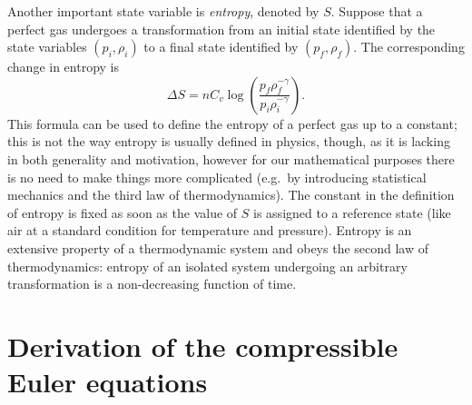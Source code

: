 Another important state variable is \emph{entropy}, denoted by $S$.
Suppose that a perfect gas undergoes a transformation from an initial
state identified by the state variables $(p_i,\rho_i)$ to a final state
identified by $(p_f,\rho_f)$. The corresponding change in entropy is
\[
\Delta S = n C_v \log\left( \frac{p_f \rho_f^{-\gamma}}{p_i \rho_i^{-\gamma}} \right).
\]
This formula can be used to define the entropy of a perfect gas up to a constant;
this is not the way entropy is usually defined in physics, though,
as it is lacking in both generality and motivation,
however for our mathematical purposes there is no need to make things
more complicated (e.g.\ by introducing statistical mechanics
and the third law of thermodynamics).
The constant in the definition of entropy is fixed as soon as the value
of $S$ is assigned to a reference state (like air at a
standard condition for temperature and pressure).
Entropy is an extensive property of a thermodynamic system and
obeys the second law of thermodynamics: entropy of an isolated system
undergoing an arbitrary transformation is a non-decreasing function of time.

\section{Derivation of the compressible Euler equations} \label{sec:derivation-euler}


